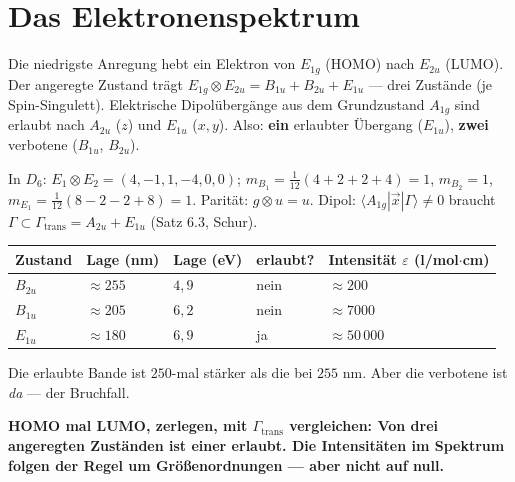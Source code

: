\section{Das Elektronenspektrum}

\begin{merksatz}
Die niedrigste Anregung hebt ein Elektron von $E_{1g}$ (HOMO) nach $E_{2u}$ (LUMO). Der angeregte Zustand trägt $E_{1g}\otimes E_{2u} = B_{1u} + B_{2u} + E_{1u}$ --- drei Zustände (je Spin-Singulett). Elektrische Dipolübergänge aus dem Grundzustand $A_{1g}$ sind erlaubt nach $A_{2u}$ ($z$) und $E_{1u}$ ($x, y$). Also: \textbf{ein} erlaubter Übergang ($E_{1u}$), \textbf{zwei} verbotene ($B_{1u}$, $B_{2u}$).

In $D_6$: $E_1\otimes E_2 = (4, -1, 1, -4, 0, 0)$; $m_{B_1} = \frac1{12}(4 + 2 + 2 + 4) = 1$, $m_{B_2} = 1$, $m_{E_1} = \frac1{12}(8 - 2 - 2 + 8) = 1$. Parität: $g\otimes u = u$. Dipol: $\langle A_{1g}|\vec x|\Gamma\rangle\neq0$ braucht $\Gamma\subset\Gamma_{\mathrm{trans}} = A_{2u} + E_{1u}$ (Satz 6.3, Schur).

\begin{center}
{\small
\renewcommand{\arraystretch}{1.46}
\begin{tabular}{@{}P{1.4cm}P{1.8cm}P{1.8cm}P{1.6cm}P{3.2cm}@{}}
\toprule
Zustand & Lage (nm) & Lage (eV) & erlaubt? & Intensität $\varepsilon$ (l/mol$\cdot$cm)\\
\midrule
$B_{2u}$ & $\approx255$ & $4{,}9$ & nein & $\approx200$\\
$B_{1u}$ & $\approx205$ & $6{,}2$ & nein & $\approx7000$\\
$E_{1u}$ & $\approx180$ & $6{,}9$ & ja & $\approx50\,000$\\
\bottomrule
\end{tabular}}
\end{center}
Die erlaubte Bande ist $250$-mal stärker als die bei $255$ nm. Aber die verbotene ist \emph{da} --- der Bruchfall.

\begin{center}
\begin{minipage}{0.9\textwidth}
\textbf{HOMO mal LUMO, zerlegen, mit $\Gamma_{\mathrm{trans}}$ vergleichen: Von drei angeregten Zuständen ist einer erlaubt. Die Intensitäten im Spektrum folgen der Regel um Größenordnungen --- aber nicht auf null.}
\end{minipage}
\end{center}
\end{merksatz}

